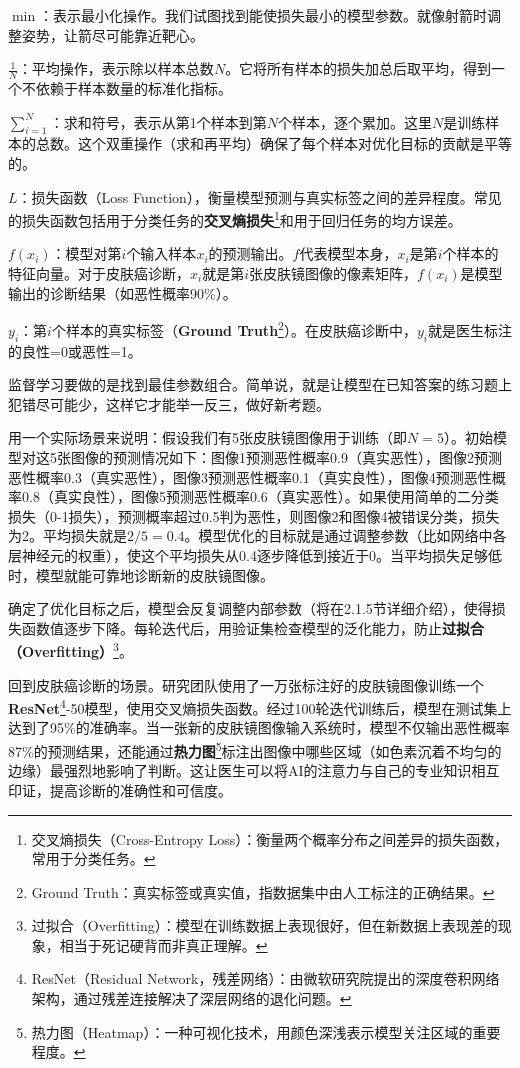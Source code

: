 $\min$：表示最小化操作。我们试图找到能使损失最小的模型参数。就像射箭时调整姿势，让箭尽可能靠近靶心。

$\frac{1}{N}$：平均操作，表示除以样本总数$N$。它将所有样本的损失加总后取平均，得到一个不依赖于样本数量的标准化指标。

$\sum_{i=1}^{N}$：求和符号，表示从第1个样本到第$N$个样本，逐个累加。这里$N$是训练样本的总数。这个双重操作（求和再平均）确保了每个样本对优化目标的贡献是平等的。

$L$：损失函数（Loss Function），衡量模型预测与真实标签之间的差异程度。常见的损失函数包括用于分类任务的\textbf{交叉熵损失}\footnote{交叉熵损失（Cross-Entropy Loss）：衡量两个概率分布之间差异的损失函数，常用于分类任务。}和用于回归任务的均方误差。

$f(x_i)$：模型对第$i$个输入样本$x_i$的预测输出。$f$代表模型本身，$x_i$是第$i$个样本的特征向量。对于皮肤癌诊断，$x_i$就是第$i$张皮肤镜图像的像素矩阵，$f(x_i)$是模型输出的诊断结果（如恶性概率90\%）。

$y_i$：第$i$个样本的真实标签（\textbf{Ground Truth}\footnote{Ground Truth：真实标签或真实值，指数据集中由人工标注的正确结果。}）。在皮肤癌诊断中，$y_i$就是医生标注的良性=0或恶性=1。

监督学习要做的是找到最佳参数组合。简单说，就是让模型在已知答案的练习题上犯错尽可能少，这样它才能举一反三，做好新考题。

用一个实际场景来说明：假设我们有5张皮肤镜图像用于训练（即$N=5$）。初始模型对这5张图像的预测情况如下：图像1预测恶性概率0.9（真实恶性），图像2预测恶性概率0.3（真实恶性），图像3预测恶性概率0.1（真实良性），图像4预测恶性概率0.8（真实良性），图像5预测恶性概率0.6（真实恶性）。如果使用简单的二分类损失（0-1损失），预测概率超过0.5判为恶性，则图像2和图像4被错误分类，损失为2。平均损失就是$2/5 = 0.4$。模型优化的目标就是通过调整参数（比如网络中各层神经元的权重），使这个平均损失从0.4逐步降低到接近于0。当平均损失足够低时，模型就能可靠地诊断新的皮肤镜图像。

确定了优化目标之后，模型会反复调整内部参数（将在2.1.5节详细介绍），使得损失函数值逐步下降。每轮迭代后，用验证集检查模型的泛化能力，防止\textbf{过拟合（Overfitting）}\footnote{过拟合（Overfitting）：模型在训练数据上表现很好，但在新数据上表现差的现象，相当于死记硬背而非真正理解。}。

回到皮肤癌诊断的场景。研究团队使用了一万张标注好的皮肤镜图像训练一个\textbf{ResNet}\footnote{ResNet（Residual Network，残差网络）：由微软研究院提出的深度卷积网络架构，通过残差连接解决了深层网络的退化问题。

}-50模型，使用交叉熵损失函数。经过100轮迭代训练后，模型在测试集上达到了95\%的准确率。当一张新的皮肤镜图像输入系统时，模型不仅输出恶性概率87\%的预测结果，还能通过\textbf{热力图}\footnote{热力图（Heatmap）：一种可视化技术，用颜色深浅表示模型关注区域的重要程度。

}标注出图像中哪些区域（如色素沉着不均匀的边缘）最强烈地影响了判断。这让医生可以将AI的注意力与自己的专业知识相互印证，提高诊断的准确性和可信度。

